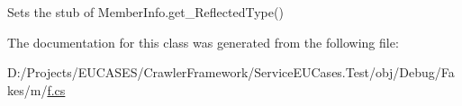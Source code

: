 Sets the stub of Member\-Info.\-get\-\_\-\-Reflected\-Type()



The documentation for this class was generated from the following file\-:\begin{DoxyCompactItemize}
\item 
D\-:/\-Projects/\-E\-U\-C\-A\-S\-E\-S/\-Crawler\-Framework/\-Service\-E\-U\-Cases.\-Test/obj/\-Debug/\-Fakes/m/\hyperlink{m_2f_8cs}{f.\-cs}\end{DoxyCompactItemize}
